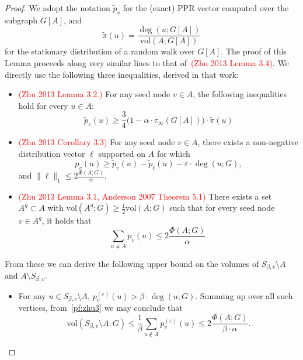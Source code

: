 \documentclass{report}
\newcommand{\vol}{\mathrm{vol}}
\newcommand{\1}{\mathbf{1}}
\newcommand{\wt}[1]{\widetilde{#1}}
\theoremstyle{alden}
\theoremstyle{aldenthm}
\theoremstyle{definition}
\theoremstyle{remark}
\begin{document}
\begin{proof}
	We adopt the notation $\wt{p}_v$ for the (exact) PPR vector computed over the subgraph $G[A]$, and 
	\begin{equation*}
	\wt{\pi}(u) = \frac{\deg(u;G[A])}{\vol(A;G[A])}
	\end{equation*}
	for the stationary distribution of a random walk over $G[A]$. The proof of this Lemma proceeds along very similar lines to that of~\textcolor{red}{(Zhu 2013 Lemma 3.4)}. We directly use the following three inequalities, derived in that work:
	\begin{itemize}
		\item \textcolor{red}{(Zhu 2013 Lemma 3.2.)} For any seed node $v \in A$, the following inequalities hold for every $u \in A$:
		\begin{equation}
		\label{pf:zhu1}
		\wt{p}_v(u) \geq \frac{3}{4}\bigl(1 - \alpha \cdot \tau_{\infty}(G[A])\bigr) \cdot \wt{\pi}(u)
		\end{equation}
		\item \textcolor{red}{(Zhu 2013 Corollary 3.3)} For any seed node $v \in A$, there exists a non-negative distribution vector $\ell$ supported on $A$ for which
		\begin{equation}
		\label{pf:zhu2}
		p_v(u) \geq \wt{p}_v(u) - \wt{p}_{\ell}(u) - \varepsilon \cdot \deg(u;G),
		\end{equation}
		and $\|\ell\|_1 \leq 2\frac{\Phi(A;G)}{\alpha}$.
		\item \textcolor{red}{(Zhu 2013 Lemma 3.1, Anderson 2007 Theorem 5.1)} There exists a set $A^g \subset A$ with $\vol(A^g;G) \geq \frac{1}{2}\vol(A;G)$ such that for every seed node $v \in A^g$, it holds that
		\begin{equation}
		\label{pf:zhu3}
		\sum_{u \neq A} p_v(u) \leq 2\frac{\Phi(A;G)}{\alpha}.
		\end{equation}
	\end{itemize}
	From these we can derive the following upper bound on the volumes of $S_{\beta,v} \setminus A$ and $A \setminus S_{\beta,v}$.
	\begin{itemize}
		\item For any $u \in S_{\beta,v} \setminus A$, $p_v^{(\varepsilon)}(u) > \beta \cdot \deg(u;G)$. Summing up over all such vertices, from~\eqref{pf:zhu3} we may conclude that
		\begin{equation*}
		\vol(S_{\beta,v} \setminus A; G) \leq \frac{1}{\beta} \sum_{u \not\in A}p_v^{(\varepsilon)}(u) \leq 2\frac{\Phi(A;G)}{\beta \cdot \alpha}.
		\end{equation*} 

\end{itemize}
\end{proof}
\end{document}
